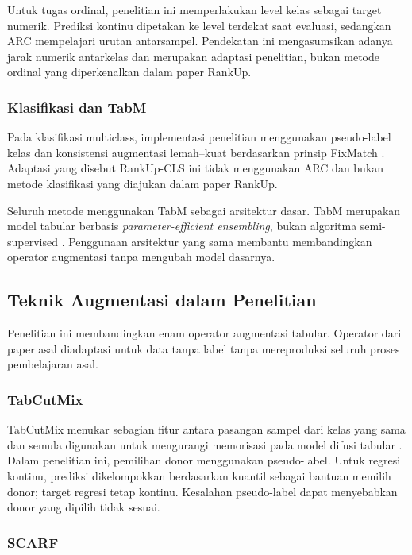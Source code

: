 Untuk tugas ordinal, penelitian ini memperlakukan level kelas sebagai target numerik. Prediksi kontinu dipetakan ke level terdekat saat evaluasi, sedangkan ARC mempelajari urutan antarsampel. Pendekatan ini mengasumsikan adanya jarak numerik antarkelas dan merupakan adaptasi penelitian, bukan metode ordinal yang diperkenalkan dalam paper RankUp.

\subsubsection{Klasifikasi dan TabM}

Pada klasifikasi multiclass, implementasi penelitian menggunakan pseudo-label kelas dan konsistensi augmentasi lemah--kuat berdasarkan prinsip FixMatch \cite{ref9}. Adaptasi yang disebut RankUp-CLS ini tidak menggunakan ARC dan bukan metode klasifikasi yang diajukan dalam paper RankUp.

Seluruh metode menggunakan TabM sebagai arsitektur dasar. TabM merupakan model tabular berbasis \textit{parameter-efficient ensembling}, bukan algoritma semi-supervised \cite{ref11}. Penggunaan arsitektur yang sama membantu membandingkan operator augmentasi tanpa mengubah model dasarnya.

\subsection{Teknik Augmentasi dalam Penelitian}

Penelitian ini membandingkan enam operator augmentasi tabular. Operator dari paper asal diadaptasi untuk data tanpa label tanpa mereproduksi seluruh proses pembelajaran asal.

\subsubsection{TabCutMix}

TabCutMix menukar sebagian fitur antara pasangan sampel dari kelas yang sama dan semula digunakan untuk mengurangi memorisasi pada model difusi tabular \cite{ref12}. Dalam penelitian ini, pemilihan donor menggunakan pseudo-label. Untuk regresi kontinu, prediksi dikelompokkan berdasarkan kuantil sebagai bantuan memilih donor; target regresi tetap kontinu. Kesalahan pseudo-label dapat menyebabkan donor yang dipilih tidak sesuai.

\subsubsection{SCARF}

